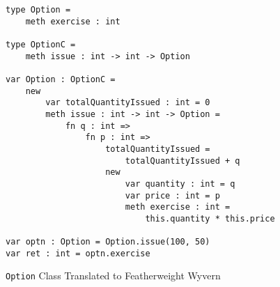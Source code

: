 \begin{figure}
  \centering
\begin{lstlisting}
type Option =
	meth exercise : int

type OptionC =
	meth issue : int -> int -> Option

var Option : OptionC =
	new
		var totalQuantityIssued : int = 0
		meth issue : int -> int -> Option =
			fn q : int =>
				fn p : int =>
					totalQuantityIssued =
						totalQuantityIssued + q
					new
						var quantity : int = q
						var price : int = p
						meth exercise : int =
							this.quantity * this.price

var optn : Option = Option.issue(100, 50)
var ret : int = optn.exercise
\end{lstlisting}
\caption{\texttt{Option} Class Translated to Featherweight Wyvern}
\label{f-example-translated}
\end{figure}